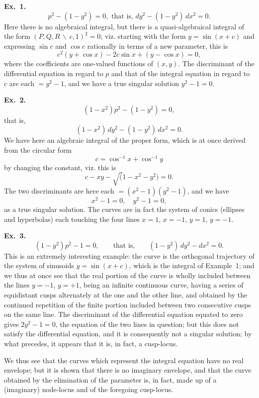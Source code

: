 \documentclass[12pt,a4paper]{article}
\theoremstyle{plain}
\theoremstyle{definition}
\theoremstyle{remark}
\begin{document}
\medskip\noindent\textbf{Ex.~1.}
\[
p^2 - (1 - y^2) = 0, \text{ that is, } dy^2 - (1-y^2)\, dx^2 = 0.
\]
Here there is no algebraical integral, but there is a quasi-algebraical integral of the form $(P, Q, R \,\backslash\, c, 1)^2 = 0$; viz. starting with the form $y = \sin(x+c)$ and expressing $\sin c$ and $\cos c$ rationally in terms of a new parameter, this is
\[
c^2(y + \cos x) - 2c\sin x + (y - \cos x) = 0,
\]
where the coefficients are one-valued functions of $(x, y)$. The discriminant of the differential equation in regard to $p$ and that of the integral equation in regard to $c$ are each $= y^2 - 1$, and we have a true singular solution $y^2 - 1 = 0$.

\medskip\noindent\textbf{Ex.~2.}
\[
(1-x^2)p^2 - (1-y^2) = 0,
\]
that is,
\[
(1-x^2)\, dy^2 - (1-y^2)\, dx^2 = 0.
\]
We have here an algebraic integral of the proper form, which is at once derived from the circular form
\[
c = \cos^{-1} x + \cos^{-1} y
\]
by changing the constant, viz. this is
\[
c - xy - \surd(1-x^2-y^2) = 0.
\]
The two discriminants are here each $= (x^2-1)(y^2-1)$, and we have
\[
x^2 - 1 = 0, \quad y^2 - 1 = 0,
\]
as a true singular solution. The curves are in fact the system of conics (ellipses and hyperbolas) each touching the four lines $x = 1$, $x = -1$, $y = 1$, $y = -1$.

\medskip\noindent\textbf{Ex.~3.}
\[
(1-y^2)p^2 - 1 = 0, \qquad \text{that is,} \qquad (1-y^2)\, dy^2 - dx^2 = 0.
\]
This is an extremely interesting example: the curve is the orthogonal trajectory of the system of sinusoids $y = \sin(x+c)$, which is the integral of Example~1; and we thus at once see that the real portion of the curve is wholly included between the lines $y = -1$, $y = +1$, being an infinite continuous curve, having a series of equidistant cusps alternately at the one and the other line, and obtained by the continued repetition of the finite portion included between two consecutive cusps on the same line. The discriminant of the differential equation equated to zero gives $2y^2 - 1 = 0$, the equation of the two lines in question; but this does not satisfy the differential equation, and it is consequently not a singular solution; by what precedes, it appears that it is, in fact, a cusp-locus.

We thus see that the curves which represent the integral equation have no real envelope; but it is shown that there is no imaginary envelope, and that the curve obtained by the elimination of the parameter is, in fact, made up of a (imaginary) node-locus and of the foregoing cusp-locus.
\end{document}
